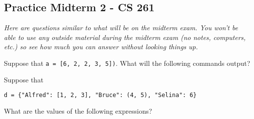 \documentclass[12pt]{exam}
\begin{document}
\pagestyle{empty}
\graphicspath{{/home/brian/Dropbox/HSC/Spring16/Math111/}}

\subsection*{Practice Midterm 2 - CS 261}
\textit{Here are questions similar to what will be on the midterm exam.  You won't be able to use any outside material during the midterm exam (no notes, computers, etc.) so see how much you can answer without looking things up.}

\begin{questions}

\question Suppose that \lstinline{a = [6, 2, 2, 3, 5])}. What will the following commands output?  


\begin{solution}
\end{solution}
 

\question Suppose that 
\begin{center}
\verb|d = {"Alfred": [1, 2, 3], "Bruce": (4, 5), "Selina": 6}|
\end{center}
What are the values of the following expressions? 

\end{questions}
\end{document}
